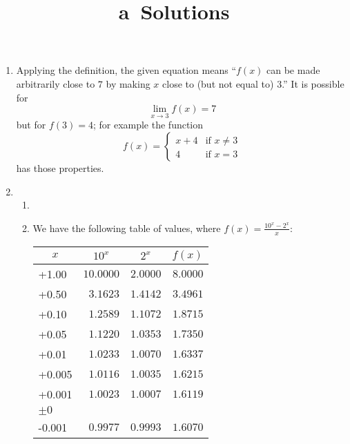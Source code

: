 \documentclass{article}
\title{\commonPSTitleZeroOneFive a\ Solutions}
\author{\commonAuthor}
\date{\commonDateZeroOneFive}
\newcommand{\ds}{\displaystyle}
\begin{document}
\maketitle
\begin{enumerate}
\item %
  Applying the definition, the given equation means ``$f(x)$ can be
  made arbitrarily close to $7$ by making $x$ close to (but not equal
  to) $3$.''  It is possible for
  \begin{equation*}
    \lim_{x\to 3} f(x)=7
  \end{equation*}
  but for $f(3)=4$; for example the function
  \begin{equation*}
    f(x) = \begin{cases}
      x+4 & \mbox{if $x\ne 3$} \\
      4   & \mbox{if $x=3$}
    \end{cases}
  \end{equation*}
  has those properties.
\item %
  \begin{enumerate}
  \item %
  \item %
    We have the following table of values, where $\ds f(x)=\frac{10^x-2^x}{x}$:
    \begin{center}
      \begin{tabular}{|l|r|r|r|}
        \hline
        \multicolumn{1}{|c|}{$x$}   
        & \multicolumn{1}{|c|}{$10^x$}    
	& \multicolumn{1}{|c|}{$2^x$}    
	& \multicolumn{1}{|c|}{$f(x)$}   \\
        \hline\hline
        +1.00   & $10.0000$ & $2.0000$ & $8.0000$ \\
        \hline
        +0.50   &  $3.1623$ & $1.4142$ & $3.4961$ \\
        \hline
        +0.10   &  $1.2589$ & $1.1072$ & $1.8715$ \\
        \hline
        +0.05   &  $1.1220$ & $1.0353$ & $1.7350$ \\
        \hline
        +0.01   &  $1.0233$ & $1.0070$ & $1.6337$ \\
        \hline
        +0.005  &  $1.0116$ & $1.0035$ & $1.6215$ \\
        \hline
        +0.001  &  $1.0023$ & $1.0007$ & $1.6119$ \\
        \hline
        $\pm 0$ &           &          &          \\
        \hline
        -0.001  &  $0.9977$ & $0.9993$ & $1.6070$ \\

\end{tabular}
\end{center}
\end{enumerate}
\end{enumerate}
\end{document}
